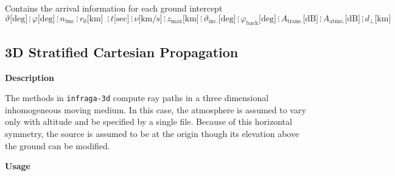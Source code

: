 \documentclass[10pt]{article}
\begin{document}
	Contains the arrival information for each ground intercept
	\begin{equation*}
	\vartheta \text{[deg]} \hspace{2pt} \vdots \hspace{2pt} 
	\varphi \text{[deg]} \hspace{2pt} \vdots \hspace{2pt} 
	n_\text{bnc} \hspace{2pt} \vdots \hspace{2pt}
	r_0 \text{[km] } \hspace{2pt} \vdots \hspace{2pt}  
	t \text{[sec]} \hspace{2pt} \vdots \hspace{2pt} 
	\nu \text{[km/s]} \hspace{2pt} \vdots \hspace{2pt} 
	z_\text{max} \text{[km]} \hspace{2pt} \vdots \hspace{2pt} 
	\vartheta_\text{inc.} \text{[deg]} \hspace{2pt} \vdots \hspace{2pt}
	\varphi_\text{back} \text{[deg]} \hspace{2pt} \vdots \hspace{2pt}
	A_\text{trans.} \text{[dB]} \hspace{2pt} \vdots \hspace{2pt}
	A_\text{atmo.} \text{[dB]} \hspace{2pt} \vdots \hspace{2pt}	
	d_\perp \text{[km]}
	\end{equation*}

\subsection{3D Stratified Cartesian Propagation}
\label{Sect:Usage:3D}
\textbf{Description}  

The methods in \verb=infraga-3d= compute ray paths in a three dimensional inhomogeneous moving medium.  In this case, the atmosphere is assumed to vary only with altitude and be specified by a single file.  Because of this horizontal symmetry, the source is assumed to be at the origin though its elevation above the ground can be modified.

\vspace{0.02\textheight}

 \hspace{-0.25in}\textbf{Usage} 
\end{document}
